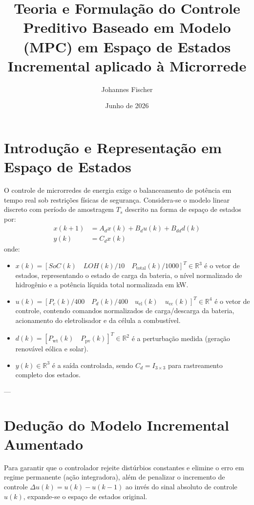 \documentclass[12pt,journal,onecolumn]{article}
\title{Teoria e Formulação do Controle Preditivo Baseado em Modelo (MPC) em Espaço de Estados Incremental aplicado à Microrrede}
\author{Johannes Fischer}
\date{Junho de 2026}
\begin{document}
\maketitle

\section{Introdução e Representação em Espaço de Estados}

O controle de microrredes de energia exige o balanceamento de potência em tempo real sob restrições físicas de segurança. Considera-se o modelo linear discreto com período de amostragem $T_s$ descrito na forma de espaço de estados por:
\begin{subequations}
\label{eq:sistema_discreto}
\begin{align}
x(k+1) &= A_d x(k) + B_d u(k) + B_{dd} d(k) \\
y(k) &= C_d x(k)
\end{align}
\end{subequations}
onde:
\begin{itemize}
    \item $x(k) = [SoC(k) \quad LOH(k)/10 \quad P_{\text{total}}(k)/1000]^T \in \mathbb{R}^3$ é o vetor de estados, representando o estado de carga da bateria, o nível normalizado de hidrogênio e a potência líquida total normalizada em kW.
    \item $u(k) = [P_c(k)/400 \quad P_d(k)/400 \quad u_{\text{el}}(k) \quad u_{\text{cc}}(k)]^T \in \mathbb{R}^4$ é o vetor de controle, contendo comandos normalizados de carga/descarga da bateria, acionamento do eletrolisador e da célula a combustível.
    \item $d(k) = [P_{\text{wt}}(k) \quad P_{\text{pv}}(k)]^T \in \mathbb{R}^2$ é a perturbação medida (geração renovável eólica e solar).
    \item $y(k) \in \mathbb{R}^3$ é a saída controlada, sendo $C_d = I_{3 \times 3}$ para rastreamento completo dos estados.
\end{itemize}

---

\section{Dedução do Modelo Incremental Aumentado}

Para garantir que o controlador rejeite distúrbios constantes e elimine o erro em regime permanente (ação integradora), além de penalizar o incremento de controle $\Delta u(k) = u(k) - u(k-1)$ ao invés do sinal absoluto de controle $u(k)$, expande-se o espaço de estados original.
\end{document}
